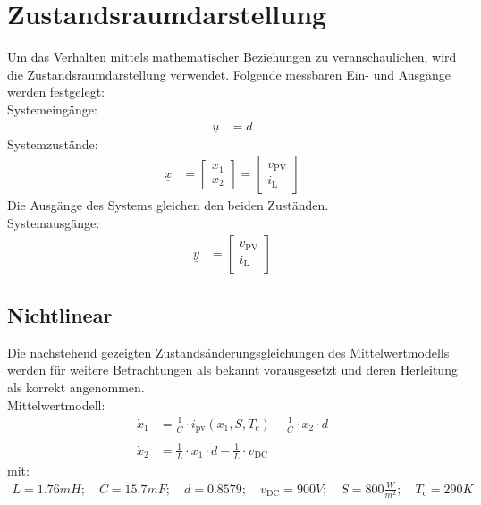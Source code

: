 \section{Zustandsraumdarstellung} \label{sec:Zustandsraumdarstellung}
Um das Verhalten mittels mathematischer Beziehungen zu veranschaulichen, wird die Zustandsraumdarstellung verwendet. Folgende messbaren Ein- und Ausgänge werden festgelegt:\\
\newline
Systemeingänge:
\begin{align*}
    \underline{u} &= d
\end{align*}
\newline
Systemzustände:
\begin{align}
    \underline{x} &=
    \begin{bmatrix}
        x_{\mathrm{1}} \\
        x_{\mathrm{2}}
    \end{bmatrix} = 
    \begin{bmatrix}
        v_{\mathrm{PV}} \\
        i_{\mathrm{L}}
    \end{bmatrix}
    \label{eq:Gleichung8}
\end{align}
\newline
Die Ausgänge des Systems gleichen den beiden Zuständen.\\
\newline
Systemausgänge:
\begin{align*}
    \underline{y} &= 
    \begin{bmatrix}
        v_{\mathrm{PV}} \\
        i_{\mathrm{L}}
    \end{bmatrix}
\end{align*}

\subsection{Nichtlinear}
\label{sec:Nichtlinear}
Die nachstehend gezeigten Zustandsänderungsgleichungen des Mittelwertmodells werden für weitere Betrachtungen als bekannt vorausgesetzt und deren Herleitung als korrekt angenommen.\\
\newline
Mittelwertmodell:
\begin{align*}
    \dot{x}_{\mathrm{1}} &= \frac{1}{C}\cdot i_{\mathrm{pv}}(x_{\mathrm{1}}, S, T_{\mathrm{c}})-\frac{1}{C}\cdot x_{\mathrm{2}}\cdot d \\\\
    \dot{x}_{\mathrm{2}} &= \frac{1}{L}\cdot x_{\mathrm{1}}\cdot d-\frac{1}{L}\cdot v_{\mathrm{DC}}
\end{align*}
\newline
mit:
\begin{align*}
    L = 1.76mH;\quad C = 15.7mF;\quad d = 0.8579;\quad v_{\mathrm{DC}} = 900V;\quad S = 800\frac{W}{m^2};\quad T_{\mathrm{c}} = 290K
\end{align*}

